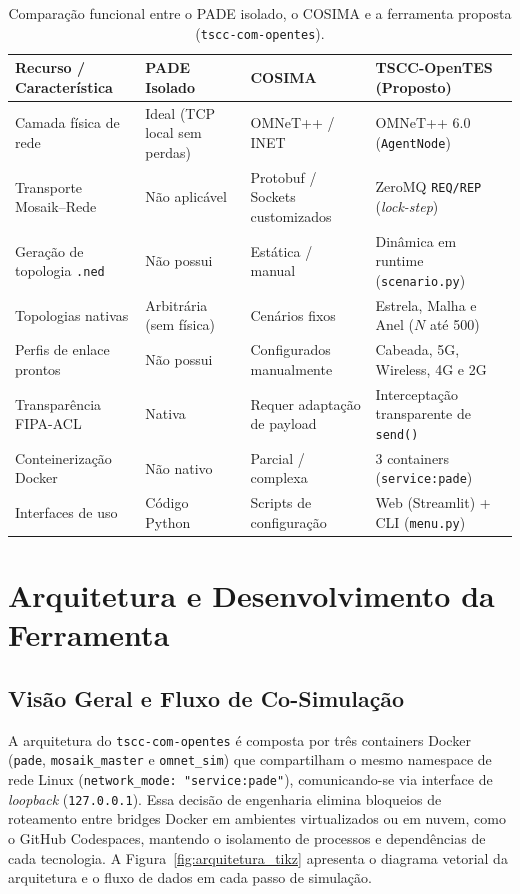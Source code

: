 \documentclass[10pt,twocolumn,a4paper]{article}
\begin{document}
\begin{table}[H]
\centering
\caption{Comparação funcional entre o PADE isolado, o COSIMA e a ferramenta proposta (\texttt{tscc-com-opentes}).}
\label{tab:comp_ferramentas}
\scriptsize
\begin{tabularx}{\columnwidth}{@{}lXXX@{}}
\toprule
\textbf{Recurso / Característica} & \textbf{PADE Isolado} & \textbf{COSIMA~\cite{prost2021cosima}} & \textbf{TSCC-OpenTES (Proposto)} \\
\midrule
Camada física de rede & Ideal (TCP local sem perdas) & OMNeT++ / INET & OMNeT++ 6.0 (\texttt{AgentNode}) \\
Transporte Mosaik--Rede & Não aplicável & Protobuf / Sockets customizados & ZeroMQ \texttt{REQ/REP} (\textit{lock-step}) \\
Geração de topologia \texttt{.ned} & Não possui & Estática / manual & Dinâmica em runtime (\texttt{scenario.py}) \\
Topologias nativas & Arbitrária (sem física) & Cenários fixos & Estrela, Malha e Anel ($N$ até 500) \\
Perfis de enlace prontos & Não possui & Configurados manualmente & Cabeada, 5G, Wireless, 4G e 2G \\
Transparência FIPA-ACL & Nativa & Requer adaptação de payload & Interceptação transparente de \texttt{send()} \\
Conteinerização Docker & Não nativo & Parcial / complexa & 3 containers (\texttt{service:pade}) \\
Interfaces de uso & Código Python & Scripts de configuração & Web (Streamlit) + CLI (\texttt{menu.py}) \\
\bottomrule
\end{tabularx}
\end{table}

\section{Arquitetura e Desenvolvimento da Ferramenta}

\subsection{Visão Geral e Fluxo de Co-Simulação}

A arquitetura do \texttt{tscc-com-opentes} é composta por três containers Docker (\texttt{pade}, \texttt{mosaik\_master} e \texttt{omnet\_sim}) que compartilham o mesmo namespace de rede Linux (\texttt{network\_mode: "service:pade"}), comunicando-se via interface de \textit{loopback} (\texttt{127.0.0.1}). Essa decisão de engenharia elimina bloqueios de roteamento entre bridges Docker em ambientes virtualizados ou em nuvem, como o GitHub Codespaces, mantendo o isolamento de processos e dependências de cada tecnologia. A Figura~\ref{fig:arquitetura_tikz} apresenta o diagrama vetorial da arquitetura e o fluxo de dados em cada passo de simulação.
\end{document}
